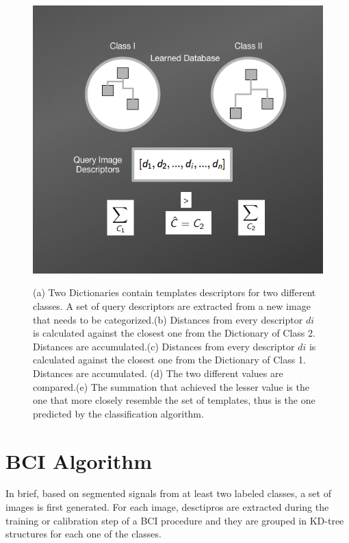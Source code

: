 \begin{figure}[h!]
{\includegraphics[scale=0.25]{images/NBNNMethod5.png}}
\caption[NBNN Classification]{(a) Two Dictionaries contain templates descriptors for two different classes. A set of query descriptors are extracted from a new image that needs to be categorized.(b) Distances from every descriptor $di$ is calculated against the closest one from the Dictionary of Class 2.  Distances are accumulated.(c) Distances from every descriptor $di$ is calculated against the closest one from the Dictionary of Class 1.  Distances are accumulated. (d) The two different values are compared.(e) The summation that achieved the lesser value is the one that more closely resemble the set of templates, thus is the one predicted by the classification algorithm.}
\label{fig:nbnnclassification}
\end{figure}


\section{BCI Algorithm}

In brief, based on segmented signals from at least two labeled classes, a set of images is first generated.  For each image, desctipros are extracted during the training or calibration step of a BCI procedure and they are grouped in KD-tree~\cite{Lowe2004} structures for each one of the classes.

